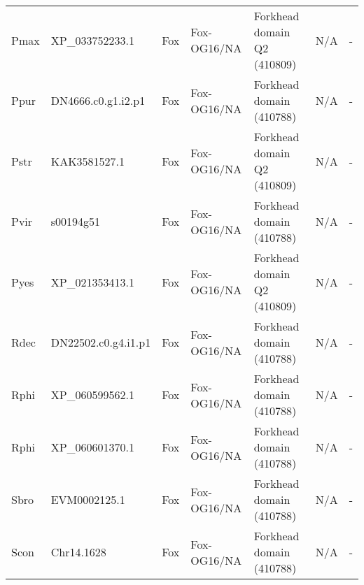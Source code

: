 \documentclass[../main.tex]{subfiles}
\begin{document}
\begin{landscape}
\begin{longtable}{lllllll}
		Pmax           & XP\_033752233.1       & Fox            & Fox-OG16/NA         & Forkhead domain Q2 (410809)                 & N/A                                                                    & -                    \\
		Ppur           & DN4666.c0.g1.i2.p1    & Fox            & Fox-OG16/NA         & Forkhead domain (410788)                    & N/A                                                                    & -                    \\
		Pstr           & KAK3581527.1          & Fox            & Fox-OG16/NA         & Forkhead domain Q2 (410809)                 & N/A                                                                    & -                    \\
		Pvir           & s00194g51             & Fox            & Fox-OG16/NA         & Forkhead domain (410788)                    & N/A                                                                    & -                    \\
		Pyes           & XP\_021353413.1       & Fox            & Fox-OG16/NA         & Forkhead domain Q2 (410809)                 & N/A                                                                    & -                    \\
		Rdec           & DN22502.c0.g4.i1.p1   & Fox            & Fox-OG16/NA         & Forkhead domain (410788)                    & N/A                                                                    & -                    \\
		Rphi           & XP\_060599562.1       & Fox            & Fox-OG16/NA         & Forkhead domain (410788)                    & N/A                                                                    & -                    \\
		Rphi           & XP\_060601370.1       & Fox            & Fox-OG16/NA         & Forkhead domain (410788)                    & N/A                                                                    & -                    \\
		Sbro           & EVM0002125.1          & Fox            & Fox-OG16/NA         & Forkhead domain (410788)                    & N/A                                                                    & -                    \\
		Scon           & Chr14.1628            & Fox            & Fox-OG16/NA         & Forkhead domain (410788)                    & N/A                                                                    & -                    \\

\end{longtable}
\end{landscape}
\end{document}
